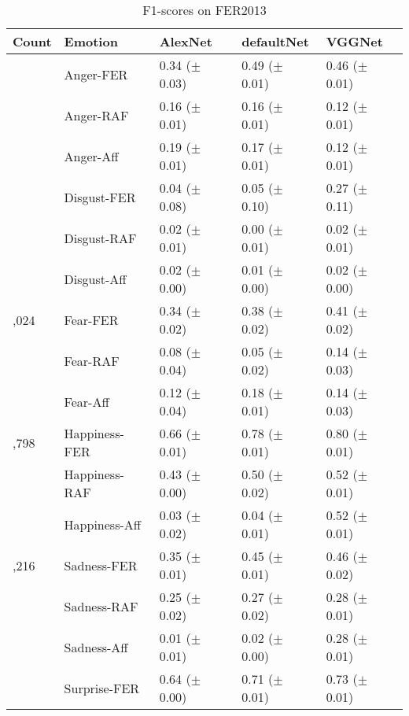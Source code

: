\documentclass[a4paper, conference]{IEEEtran}
\begin{document}
\begin{table}[htbp]
	\caption{F1-scores on FER2013}
	\begin{center}
		\begin{tabular}{>{\raggedleft\arraybackslash}p{0.7cm}p{1.82cm}p{1.55cm}p{1.55cm}p{1.55cm}@{}} %
			\hline
			\hline %
			Count & Emotion & AlexNet & defaultNet & VGGNet \\
			\hline
			\hline
			991 & Anger-FER & 0.34 ($\pm$ 0.03) & 0.49 ($\pm$ 0.01) & 0.46 ($\pm$ 0.01) \\
			    & Anger-RAF & 0.16 ($\pm$ 0.01) & 0.16 ($\pm$ 0.01) & 0.12 ($\pm$ 0.01) \\
			    & Anger-Aff & 0.19 ($\pm$ 0.01) & 0.17 ($\pm$ 0.01) & 0.12 ($\pm$ 0.01) \\
			\hline %
			109 & Disgust-FER & 0.04 ($\pm$ 0.08) & 0.05 ($\pm$ 0.10) & 0.27 ($\pm$ 0.11) \\
			    & Disgust-RAF & 0.02 ($\pm$ 0.01) & 0.00 ($\pm$ 0.01) & 0.02 ($\pm$ 0.01) \\
			    & Disgust-Aff & 0.02 ($\pm$ 0.00) & 0.01 ($\pm$ 0.00) & 0.02 ($\pm$ 0.00) \\
			\hline %
			1,024 & Fear-FER & 0.34 ($\pm$ 0.02) & 0.38 ($\pm$ 0.02) & 0.41 ($\pm$ 0.02) \\
			      & Fear-RAF & 0.08 ($\pm$ 0.04) & 0.05 ($\pm$ 0.02) & 0.14 ($\pm$ 0.03) \\
			      & Fear-Aff & 0.12 ($\pm$ 0.04) & 0.18 ($\pm$ 0.01) & 0.14 ($\pm$ 0.03) \\
			\hline %
			1,798 & Happiness-FER & 0.66 ($\pm$ 0.01) & 0.78 ($\pm$ 0.01) & 0.80 ($\pm$ 0.01) \\
			      & Happiness-RAF& 0.43 ($\pm$ 0.00) & 0.50 ($\pm$ 0.02) & 0.52 ($\pm$ 0.01) \\
			      & Happiness-Aff & 0.03 ($\pm$ 0.02) & 0.04 ($\pm$ 0.01) & 0.52 ($\pm$ 0.01) \\
			\hline %
			1,216 & Sadness-FER & 0.35 ($\pm$ 0.01) & 0.45 ($\pm$ 0.01) & 0.46 ($\pm$ 0.02) \\
			      & Sadness-RAF & 0.25 ($\pm$ 0.02) & 0.27 ($\pm$ 0.02) & 0.28 ($\pm$ 0.01) \\
			      & Sadness-Aff & 0.01 ($\pm$ 0.01) & 0.02 ($\pm$ 0.00) & 0.28 ($\pm$ 0.01) \\
			\hline %
			800 & Surprise-FER & 0.64 ($\pm$ 0.00) & 0.71 ($\pm$ 0.01) & 0.73 ($\pm$ 0.01) \\

\end{tabular}
\end{center}
\end{table}
\end{document}
